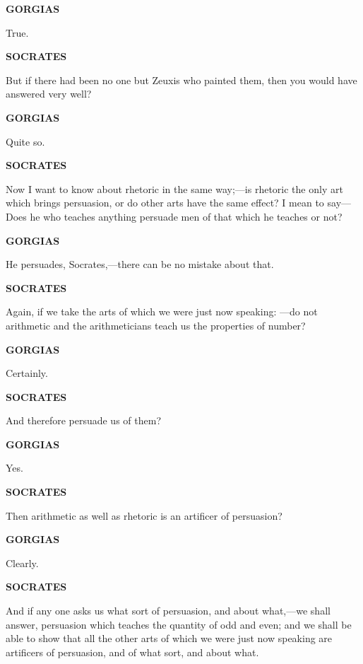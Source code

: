 \documentclass[11pt,letter]{article}
\begin{document}
\par \textbf{GORGIAS}
\par   True.

\par \textbf{SOCRATES}
\par   But if there had been no one but Zeuxis who painted them, then you would have answered very well?

\par \textbf{GORGIAS}
\par   Quite so.

\par \textbf{SOCRATES}
\par   Now I want to know about rhetoric in the same way;—is rhetoric the only art which brings persuasion, or do other arts have the same effect? I mean to say—Does he who teaches anything persuade men of that which he teaches or not?

\par \textbf{GORGIAS}
\par   He persuades, Socrates,—there can be no mistake about that.

\par \textbf{SOCRATES}
\par   Again, if we take the arts of which we were just now speaking: —do not arithmetic and the arithmeticians teach us the properties of number?

\par \textbf{GORGIAS}
\par   Certainly.

\par \textbf{SOCRATES}
\par   And therefore persuade us of them?

\par \textbf{GORGIAS}
\par   Yes.

\par \textbf{SOCRATES}
\par   Then arithmetic as well as rhetoric is an artificer of persuasion?

\par \textbf{GORGIAS}
\par   Clearly.

\par \textbf{SOCRATES}
\par   And if any one asks us what sort of persuasion, and about what,—we shall answer, persuasion which teaches the quantity of odd and even; and we shall be able to show that all the other arts of which we were just now speaking are artificers of persuasion, and of what sort, and about what.
\end{document}
